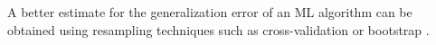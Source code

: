 A better estimate for the generalization error of an ML algorithm can be obtained using resampling techniques such as cross-validation or bootstrap \citep{Bischl2012}. %
